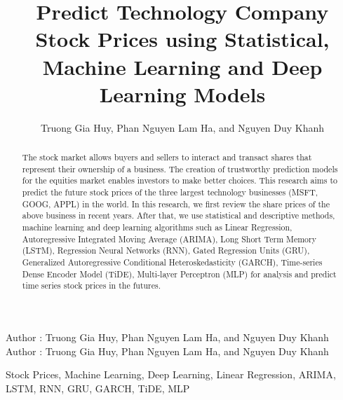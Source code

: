 \documentclass{ieeeojies}
\begin{document}
\title{Predict Technology Company Stock Prices using Statistical, 
Machine Learning and Deep Learning Models}

\author{Truong Gia Huy, Phan Nguyen Lam Ha, and Nguyen Duy Khanh}

\address[1]{Faculty of Information Systems, University of Information Technology, (e-mail: 21522172@gm.uit.edu.vn)}
\address[2]{Faculty of Information Systems, University of Information Technology, (e-mail: 21522030@gm.uit.edu.vn)}
\address[3]{Faculty of Information Systems, University of Information Technology, (e-mail: 21522208@gm.uit.edu.vn)}

\markboth
{Author \headeretal: Truong Gia Huy, Phan Nguyen Lam Ha, and Nguyen Duy Khanh}
{Author \headeretal: Truong Gia Huy, Phan Nguyen Lam Ha, and Nguyen Duy Khanh}

\begin{abstract}
The stock market allows buyers and sellers to interact and transact shares that represent their ownership of a business. The creation of trustworthy prediction models for the equities market enables investors to make better choices. This research aims to predict the future stock prices of the three largest technology businesses (MSFT, GOOG, APPL) in the world. In this research, we first review the share prices of the above business in recent years. After that, we use statistical and descriptive methods, machine learning and deep learning algorithms such as Linear Regression, Autoregressive Integrated Moving Average (ARIMA), Long Short Term Memory (LSTM), Regression Neural Networks (RNN), Gated Regression Units (GRU), Generalized Autoregressive Conditional Heteroskedasticity (GARCH), Time-series Dense Encoder Model (TiDE), Multi-layer Perceptron (MLP) for analysis and predict time series stock prices in the futures.
\end{abstract}


\begin{keywords}
Stock Prices, Machine Learning, Deep Learning, Linear Regression, ARIMA, LSTM, RNN, GRU, GARCH, TiDE, MLP
\end{keywords}

\titlepgskip=-15pt

\maketitle
\end{document}

